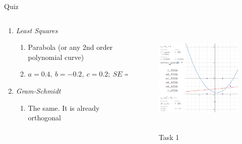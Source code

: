 \documentclass[aspectratio=169]{beamer}
\begin{document}
\begin{frame}[t]{Quiz}
{\begin{columns}[T,onlytextwidth]
            \begin{column}{0.49\textwidth}
                \begin{enumerate}
                    \item \textit{Least Squares}
                          \begin{enumerate}
                              \item Parabola (or any 2nd order polynomial curve)
                              \item $a = 0.4,\ b=-0.2,\ c = 0.2;\ SE = 6.4$
                          \end{enumerate}
                    \item \textit{Gram-Schmidt}
                          \begin{enumerate}
                              \item The same. It is already orthogonal \heartsuit
                          \end{enumerate}
                \end{enumerate}
            \end{column}
            \begin{column}{0.49\textwidth}
                \vspace{-1.2cm}
                \begin{figure}[H]
                    \centering\includegraphics[height=5.5cm,width=1\textwidth,keepaspectratio]{quiz_ans.png}
                    \caption*{\Large Task 1}
                    \label{fig:quiz_ans}
                \end{figure}
            \end{column}
        \end{columns}
    }
\end{frame}
\end{document}
